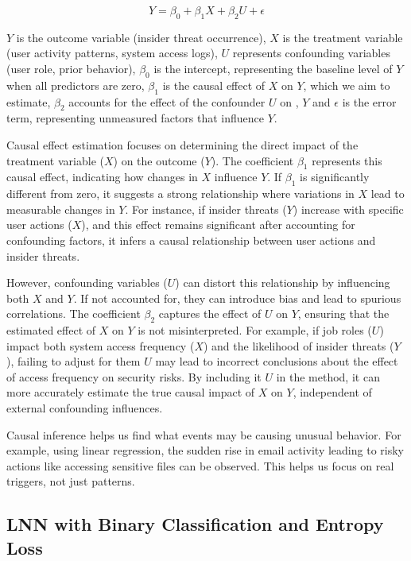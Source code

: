 \begin{equation}
Y = \beta_0 + \beta_1 X + \beta_2 U + \epsilon
\label{eq2}
\end{equation}

\( Y \) is the outcome variable (insider threat occurrence), \( X \) is the treatment variable (user activity patterns, system access logs), \( U \) represents confounding variables (user role, prior behavior), \( \beta_0 \) is the intercept, representing the baseline level of \( Y \) when all predictors are zero, \( \beta_1 \) is the causal effect of \( X \) on \( Y \), which we aim to estimate, \( \beta_2 \) accounts for the effect of the confounder \( U \) on , \( Y \) and \( \epsilon \) is the error term, representing unmeasured factors that influence \( Y \).

Causal effect estimation focuses on determining the direct impact of the treatment variable (\(X\)) on the outcome (\(Y\)). The coefficient \(\beta_1\) represents this causal effect, indicating how changes in \(X\) influence \(Y\). If \(\beta_1\) is significantly different from zero, it suggests a strong relationship where variations in \(X\) lead to measurable changes in \(Y\). For instance, if insider threats (\(Y\)) increase with specific user actions (\(X\)), and this effect remains significant after accounting for confounding factors, it infers a causal relationship between user actions and insider threats. 

However, confounding variables (\(U\)) can distort this relationship by influencing both \(X\) and \(Y\). If not accounted for, they can introduce bias and lead to spurious correlations. The coefficient \(\beta_2\) captures the effect of \(U\) on \(Y\), ensuring that the estimated effect of \(X\) on \(Y\) is not misinterpreted. For example, if job roles (\(U\)) impact both system access frequency (\(X\)) and the likelihood of insider threats (\(Y\)), failing to adjust for them \(U\) may lead to incorrect conclusions about the effect of access frequency on security risks. By including it \(U\) in the method, it can more accurately estimate the true causal impact of \(X\) on \(Y\), independent of external confounding influences.

Causal inference helps us find what events may be causing unusual behavior. For example, using linear regression, the sudden rise in email activity leading to risky actions like accessing sensitive files can be observed. This helps us focus on real triggers, not just patterns.

\subsection{LNN with Binary Classification and Entropy Loss}

